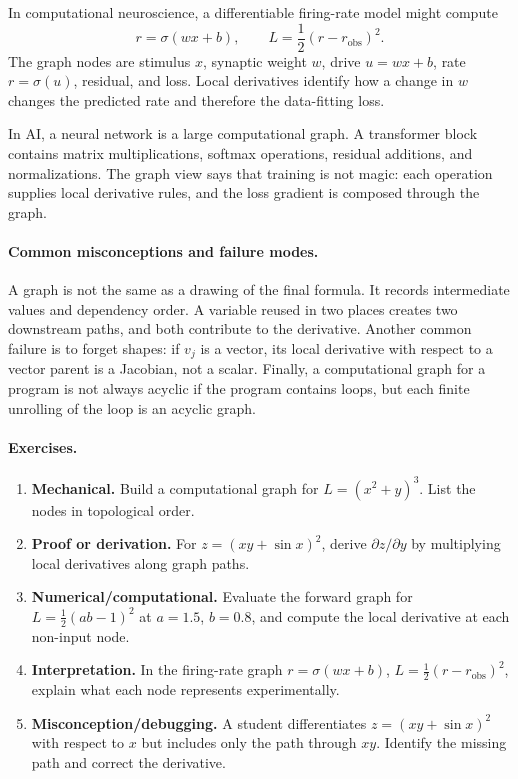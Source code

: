 In computational neuroscience, a differentiable firing-rate model might compute
\[
r=\sigma(wx+b),\qquad L=\frac12(r-r_{\mathrm{obs}})^2.
\]
The graph nodes are stimulus \(x\), synaptic weight \(w\), drive \(u=wx+b\), rate \(r=\sigma(u)\), residual, and loss. Local derivatives identify how a change in \(w\) changes the predicted rate and therefore the data-fitting loss.

In AI, a neural network is a large computational graph. A transformer block contains matrix multiplications, softmax operations, residual additions, and normalizations. The graph view says that training is not magic: each operation supplies local derivative rules, and the loss gradient is composed through the graph.

\paragraph{Common misconceptions and failure modes.}
A graph is not the same as a drawing of the final formula. It records intermediate values and dependency order. A variable reused in two places creates two downstream paths, and both contribute to the derivative. Another common failure is to forget shapes: if \(v_j\) is a vector, its local derivative with respect to a vector parent is a Jacobian, not a scalar. Finally, a computational graph for a program is not always acyclic if the program contains loops, but each finite unrolling of the loop is an acyclic graph.

\paragraph{Exercises.}
\begin{enumerate}[label=\textbf{23.1.\arabic*.}, leftmargin=*]
\item \textbf{Mechanical.} Build a computational graph for \(L=(x^2+y)^3\). List the nodes in topological order.
\item \textbf{Proof or derivation.} For \(z=(xy+\sin x)^2\), derive \(\partial z/\partial y\) by multiplying local derivatives along graph paths.
\item \textbf{Numerical/computational.} Evaluate the forward graph for \(L=\frac12(ab-1)^2\) at \(a=1.5\), \(b=0.8\), and compute the local derivative at each non-input node.
\item \textbf{Interpretation.} In the firing-rate graph \(r=\sigma(wx+b)\), \(L=\frac12(r-r_{\mathrm{obs}})^2\), explain what each node represents experimentally.
\item \textbf{Misconception/debugging.} A student differentiates \(z=(xy+\sin x)^2\) with respect to \(x\) but includes only the path through \(xy\). Identify the missing path and correct the derivative.
\end{enumerate}

